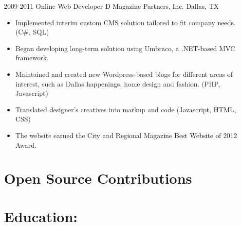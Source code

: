 \documentclass{moderncv}
\begin{document}
	\cventry
	{2009-2011}
	{Online Web Developer}   
	{D Magazine Partners, Inc.}
	{Dallas, TX}{}
	{
		\begin{itemize}
			\item {Implemented interim custom CMS solution tailored to fit company needs. (C\#, SQL)}
			\item {Began developing long-term solution using Umbraco, a .NET-based MVC framework.}
			\item {Maintained and created new Wordpress-based blogs for different areas of interest, such as Dallas happenings, home design and fashion. (PHP, Javascript)}
			\item {Translated designer's creatives into markup and code (Javascript, HTML, CSS)}
			\item {The website earned the City and Regional Magazine Best Website of 2012 Award.}
		\end{itemize}
	}
	
	\section{Open Source Contributions}
	\section{Education:}
	
\end{document}
